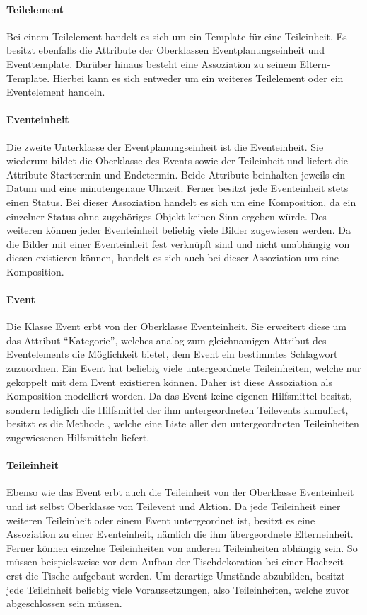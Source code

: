 \paragraph{Teilelement}
Bei einem Teilelement handelt es sich um ein Template für eine Teileinheit. Es besitzt ebenfalls die Attribute der Oberklassen Eventplanungseinheit und Eventtemplate. Darüber hinaus besteht eine Assoziation zu seinem Eltern-Template. Hierbei kann es sich entweder um ein weiteres Teilelement oder ein Eventelement handeln.

\paragraph{Eventeinheit}
Die zweite Unterklasse der Eventplanungseinheit ist die Eventeinheit. Sie wiederum bildet die Oberklasse des Events sowie der Teileinheit und liefert die Attribute Starttermin und Endetermin. Beide Attribute beinhalten jeweils ein Datum und eine minutengenaue Uhrzeit. Ferner besitzt jede Eventeinheit stets einen Status. Bei dieser Assoziation handelt es sich um eine Komposition, da ein einzelner Status ohne zugehöriges Objekt keinen Sinn ergeben würde. Des weiteren können jeder Eventeinheit beliebig viele Bilder zugewiesen werden. Da die Bilder mit einer Eventeinheit fest verknüpft sind und nicht unabhängig von diesen existieren können, handelt es sich auch bei dieser Assoziation um eine Komposition.

\paragraph{Event}
Die Klasse Event erbt von der Oberklasse Eventeinheit. Sie erweitert diese um das Attribut \enquote{Kategorie}, welches analog zum gleichnamigen Attribut des Eventelements die Möglichkeit bietet, dem Event ein bestimmtes Schlagwort zuzuordnen. Ein Event hat beliebig viele untergeordnete Teileinheiten, welche nur gekoppelt mit dem Event existieren können. Daher ist diese Assoziation als Komposition modelliert worden. Da das Event keine eigenen Hilfsmittel besitzt, sondern lediglich die Hilfsmittel der ihm untergeordneten Teilevents kumuliert, besitzt es die Methode , welche eine Liste aller den untergeordneten Teileinheiten zugewiesenen Hilfsmitteln liefert.

\paragraph{Teileinheit}
Ebenso wie das Event erbt auch die Teileinheit von der Oberklasse Eventeinheit und ist selbst Oberklasse von Teilevent und Aktion. Da jede Teileinheit einer weiteren Teileinheit oder einem Event untergeordnet ist, besitzt es eine Assoziation zu einer Eventeinheit, nämlich die ihm übergeordnete Elterneinheit. Ferner können einzelne Teileinheiten von anderen Teileinheiten abhängig sein. So müssen beispielsweise vor dem Aufbau der Tischdekoration bei einer Hochzeit erst die Tische aufgebaut werden. Um derartige Umstände abzubilden, besitzt jede Teileinheit beliebig viele Voraussetzungen, also Teileinheiten, welche zuvor abgeschlossen sein müssen.

